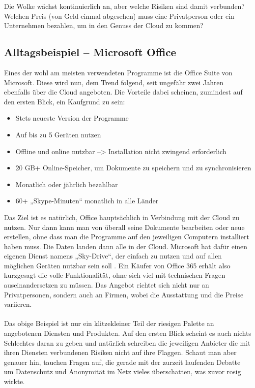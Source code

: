 Die Wolke wächst kontinuierlich an, aber welche Risiken sind damit verbunden? Welchen Preis (von Geld einmal abgesehen) muss eine Privatperson oder ein Unternehmen bezahlen, um in den Genuss der Cloud zu kommen?

\subsection{Alltagsbeispiel – Microsoft Office}
Eines der wohl am meisten verwendeten Programme ist die Office Suite von Microsoft. Diese wird nun, dem Trend folgend, seit ungefähr zwei Jahren ebenfalls über die Cloud angeboten. Die Vorteile dabei scheinen, zumindest auf den ersten Blick, ein Kaufgrund zu sein:
\begin{itemize}
\item Stets neueste Version der Programme
\item Auf bis zu 5 Geräten nutzen
\item Offline und online nutzbar --> Installation nicht zwingend erforderlich
\item 20 GB+ Online-Speicher, um Dokumente zu speichern und zu synchronisieren
\item Monatlich oder jährlich bezahlbar
\item 60+ „Skype-Minuten“ monatlich in alle Länder
\end{itemize}

Das Ziel ist es natürlich, Office hauptsächlich in Verbindung mit der Cloud zu nutzen. Nur dann kann man von überall seine Dokumente bearbeiten oder neue erstellen, ohne dass man die Programme auf den jeweiligen Computern installiert haben muss. Die Daten landen dann alle in der Cloud. Microsoft hat dafür einen eigenen Dienst namens „Sky-Drive“, der einfach zu nutzen und auf allen möglichen Geräten nutzbar sein soll . Ein Käufer von Office 365 erhält also kurzgesagt die volle Funktionalität, ohne sich viel mit technischen Fragen auseinandersetzen zu müssen.
Das Angebot richtet sich nicht nur an Privatpersonen, sondern auch an Firmen, wobei die Ausstattung und die Preise variieren.
\\
\\
Das obige Beispiel ist nur ein klitzekleiner Teil der riesigen Palette an angebotenen Diensten und Produkten. Auf den ersten Blick scheint es auch nichts Schlechtes daran zu geben und natürlich schreiben die jeweiligen Anbieter die mit ihren Diensten verbundenen Risiken nicht auf ihre Flaggen. Schaut man aber genauer hin, tauchen Fragen auf, die gerade mit der zurzeit laufenden Debatte um Datenschutz und Anonymität im Netz vieles überschatten, was zuvor rosig wirkte.

